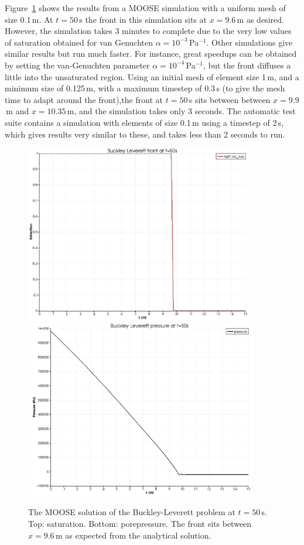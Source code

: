 \documentclass[]{scrreprt}
\begin{document}
Figure~\ref{satfront.figa} shows the results from a MOOSE simulation
with a uniform mesh of size 0.1\,m.  At $t=50$\,s the front in this
simulation sits at $x=9.6$\,m as desired.  However, the simulation
takes 3 minutes to complete due to the very low values of saturation
obtained for van Genuchten $\alpha=10^{-3}$\,Pa$^{-1}$.  Other
simulations give similar results but run much faster.  For instance,
great speedups can be obtained by setting the van-Genuchten parameter
$\alpha=10^{-4}$\,Pa$^{-1}$, but the front diffuses a little into the
unsaturated region.  Using an initial mesh of element size 1\,m, and a
minimum size of 0.125\,m, with a maximum timestep of 0.3\,s (to give
the mesh time to adapt around the front),the front at $t=50$\,s sits
between between $x=9.9$\,m and $x=10.35$\,m, and the simulation takes
only 3 seconds.  The automatic test suite contains a simulation with
elements of size 0.1\,m using a timestep of 2\,s, which gives results
very similar to these, and takes less than 2 seconds to run.

\begin{figure}[htb]
\begin{center}
\includegraphics[width=10cm]{bl_seff.eps} \\
$\mbox{}$
\includegraphics[width=10cm]{bl_p.eps} \\
\caption{The MOOSE solution of the Buckley-Leverett problem at
  $t=50$\,s.  Top: saturation.  Bottom: porepressure.  The front sits
  between $x=9.6$\,m as expected from the analytical solution.}
\label{satfront.figa}
\end{center}
\end{figure}
\end{document}
